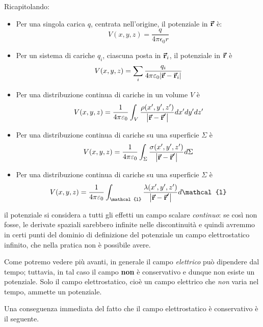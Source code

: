 Ricapitolando:
\begin{itemize}
	\item Per una singola carica $q$, centrata nell'origine, il potenziale in $\vb*{\va{r}}$ è:
	\begin{equation}
		V(x,y,z)=\frac{q}{4\pi\epsilon_0r}
	\end{equation}
	\item Per un sistema di cariche $q_i$, ciascuna posta in $\vb*{\va{r}}_i$, il potenziale in $\vb*{\va{r}}$ è
	\begin{equation}
		V(x,y,z)=\sum_i\frac{q_i}{4\pi\varepsilon_0\abs{\vb*{\va{r}}-\vb*{\va{r}}_i}}
	\end{equation}
	\item Per una distribuzione continua di cariche in un volume $V$ è
	\begin{equation}
		V(x,y,z)=\frac{1}{4\pi\varepsilon_0}\int_{V}\frac{\rho(x',y',z')}{\abs{\vb*{\va{r}}-\vb*{\va{r}}'}}dx'dy'dz'
	\end{equation}
	\item Per una distribuzione continua di cariche su una superficie $\Sigma$ è
	\begin{equation}
		V(x,y,z)=\frac{1}{4\pi\varepsilon_0}\int_{\Sigma}\frac{\sigma(x',y',z')}{\abs{\vb*{\va{r}}-\vb*{\va{r}}'}}d\Sigma
	\end{equation}
	\item Per una distribuzione continua di cariche su una superficie $\Sigma$ è
	\begin{equation}
		V(x,y,z)=\frac{1}{4\pi\epsilon_0}\int_\mathcal{l}\frac{\lambda(x',y',z')}{\abs{\vba{r}-\vba{r}'}}d\mathcal{l}
	\end{equation}
\end{itemize}
\begin{observe}
	il potenziale si considera a tutti gli effetti un campo scalare \textit{continuo}: se così non fosse, le derivate spaziali sarebbero infinite nelle discontinuità e quindi avremmo in certi punti del dominio di definizione del potenziale un campo elettrostatico infinito, che nella pratica non è possibile avere.
\end{observe}
\begin{attention}
	Come potremo vedere più avanti, in generale il campo \textit{elettrico} può dipendere dal tempo; tuttavia, in tal caso il campo \textbf{non} è conservativo e dunque non esiste un potenziale. Solo il campo elettrostatico, cioè un campo elettrico che \textit{non} varia nel tempo, ammette un potenziale.
\end{attention}
Una conseguenza immediata del fatto che il campo elettrostatico è conservativo è il seguente.
